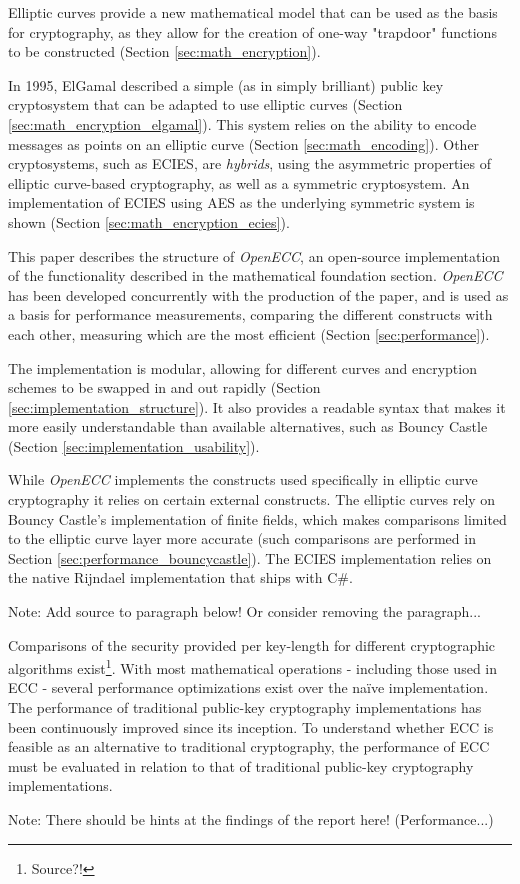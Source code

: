 Elliptic curves provide a new mathematical model that can be used as the basis for cryptography,
as they allow for the creation of one-way "trapdoor" functions to be constructed (Section
\ref{sec:math_encryption}).

In 1995, ElGamal described a simple (as in simply brilliant) public key cryptosystem that can be adapted
to use elliptic curves (Section \ref{sec:math_encryption_elgamal}). This system relies on the ability to
encode messages as points on an elliptic curve (Section \ref{sec:math_encoding}). Other cryptosystems,
such as ECIES, are \emph{hybrids}, using the asymmetric properties of elliptic curve-based cryptography,
as well as a symmetric cryptosystem. An implementation of ECIES using AES as the underlying symmetric
system is shown (Section \ref{sec:math_encryption_ecies}).

This paper describes the structure of \emph{OpenECC}, an open-source implementation of the functionality
described in the mathematical foundation section. \emph{OpenECC} has been developed concurrently with the
production of the paper, and is used as a basis for performance measurements, comparing the different constructs
with each other, measuring which are the most efficient (Section \ref{sec:performance}).

The implementation is modular, allowing for different curves and encryption schemes to be swapped in and out
rapidly (Section \ref{sec:implementation_structure}). It also provides a readable syntax that makes it more easily
understandable than available alternatives, such as Bouncy Castle (Section \ref{sec:implementation_usability}).

While \emph{OpenECC} implements the constructs used specifically in elliptic curve cryptography it relies on certain
external constructs. The elliptic curves rely on Bouncy Castle's implementation of finite fields, which makes comparisons
limited to the elliptic curve layer more accurate (such comparisons are performed in Section \ref{sec:performance_bouncycastle}).
The ECIES implementation relies on the native Rijndael implementation that ships with C\#.

Note: Add source to paragraph below! Or consider removing the paragraph...

Comparisons of the security provided per key-length for different cryptographic algorithms exist\footnote{Source?!}. With
most mathematical operations - including those used in ECC - several performance optimizations exist over the naïve
implementation. The performance of traditional public-key cryptography implementations has been continuously improved
since its inception. To understand whether ECC is feasible as an alternative to traditional cryptography, the performance
of ECC must be evaluated in relation to that of traditional public-key cryptography implementations.

Note: There should be hints at the findings of the report here! (Performance...)